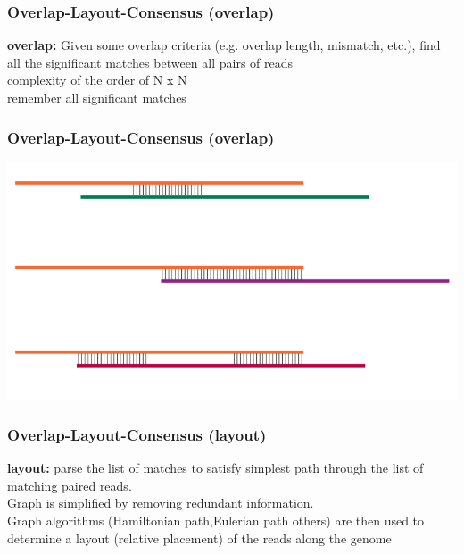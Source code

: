 \documentclass[pdf]{beamer}
\begin{document}
\begin{frame}
\frametitle{Overlap-Layout-Consensus (overlap)}
\textbf{overlap:}
Given some overlap criteria (e.g. overlap length, mismatch, etc.), find all the significant matches between all pairs of reads\\
complexity of the order of N x N\\
remember all significant matches\\
\end{frame}


\begin{frame}
\frametitle{Overlap-Layout-Consensus (overlap)}
\begin{center}
\includegraphics[scale=0.5]{Figures/overlap.png}
\end{center}
\end{frame}
 
\begin{frame}
\frametitle{Overlap-Layout-Consensus (layout)}
\textbf{layout:}
parse the list of matches to satisfy simplest path through the list of matching paired reads.\\
Graph is simplified by removing redundant information.\\
Graph algorithms (Hamiltonian path,Eulerian path others) are then used to determine a layout (relative placement) of the reads along the genome
\end{frame}
\end{document}
